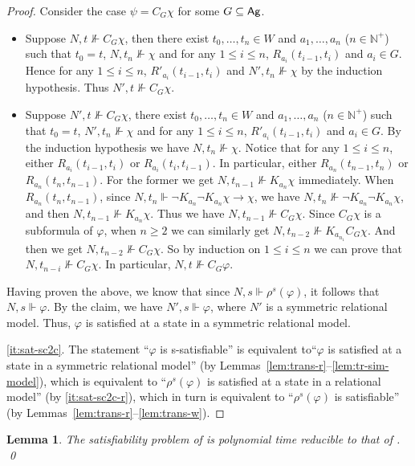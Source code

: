 \documentclass{article}
\newtheorem{lemma}[theorem]{Lemma}%
\newcommand{\ag}{\text{\normalfont\textsf{Ag}}\xspace}
\renewcommand{\phi}{\varphi}
\newcommand{\ra}{\rightarrow}
\newcommand{\mbN}{\mathbb{N}}
\newcommand{\lc}{\text{\normalfont ELC}\xspace}
\newcommand{\lsc}{\text{\normalfont ELC$^s$}\xspace}
\begin{document}
\begin{proof}
Consider the case $\psi=C_G\chi$ for some $G\subseteq\ag$.
\begin{itemize}
\item Suppose $N,t\not\Vdash C_G\chi$, then there exist $t_0,\dots,t_n\in W$ and $a_1,\dots,a_n$ ($n\in\mbN^+$) such that $t_0=t$, $N,t_n\not\Vdash\chi$ and for any $1\leq i\leq n$, $R_{a_i}(t_{i-1},t_i)$ and $a_i\in G$. Hence for any $1\leq i\leq n$, $R'_{a_i}(t_{i-1},t_i)$ and $N',t_n\not\Vdash\chi$ by the induction hypothesis. Thus $N',t\not\Vdash C_G\chi$.
\item Suppose $N',t\not\Vdash C_G\chi$, there exist $t_0,\dots,t_n\in W$ and $a_1,\dots,a_n$ ($n\in\mbN^+$) such that $t_0=t$, $N',t_n\not\Vdash\chi$ and for any $1\leq i\leq n$, $R'_{a_i}(t_{i-1},t_i)$ and $a_i\in G$. By the induction hypothesis we have $N,t_n\not\Vdash\chi$. Notice that for any $1\leq i\leq n$, either $R_{a_i}(t_{i-1},t_i)$ or $R_{a_i}(t_i,t_{i-1})$. In particular, either $R_{a_n}(t_{n-1},t_n)$ or $R_{a_n}(t_n,t_{n-1})$. For the former we get $N,t_{n-1}\not\Vdash K_{a_n}\chi$ immediately. When $R_{a_n}(t_n,t_{n-1})$, since $N,t_n\Vdash\neg K_{a_n}\neg K_{a_n}\chi\ra\chi$, we have $N,t_n\not\Vdash\neg K_{a_n}\neg K_{a_n}\chi$, and then $N,t_{n-1}\not\Vdash K_{a_n}\chi$. Thus we have $N,t_{n-1}\not\Vdash C_G\chi$. Since $C_G\chi$ is a subformula of $\phi$, when $n\geq 2$ we can similarly get $N,t_{n-2}\not\Vdash K_{a_{n_1}}C_G\chi$. And then we get $N,t_{n-2}\not\Vdash C_G\chi$. So by induction on $1\leq i\leq n$ we can prove that $N,t_{n-i}\not\Vdash C_G\chi$. In particular, $N,t\not\Vdash C_G\phi$.
\end{itemize}
Having proven the above, we know that since $N,s\Vdash\rho^s(\phi)$, it follows that $N,s\Vdash\phi$. By the claim, we have $N',s\Vdash\phi$, where $N'$ is a symmetric relational model. Thus, $\phi$ is satisfied at a state in a symmetric relational model.

\ref{it:sat-sc2c}. The statement ``$\phi$ is s-satisfiable'' is equivalent to``$\phi$ is satisfied at a state in a symmetric relational model'' (by Lemmas~\ref{lem:trans-r}--\ref{lem:tr-sim-model}), which is equivalent to ``$\rho^s(\phi)$ is satisfied at a state in a relational model'' (by \ref{it:sat-sc2c-r}), which in turn is equivalent to ``$\rho^s(\phi)$ is satisfiable'' (by Lemmas~\ref{lem:trans-r}--\ref{lem:trans-w}).
\end{proof}

\begin{lemma}\label{lem:red-sc2c}
The satisfiability problem of \lsc is polynomial time reducible to that of \lc.
\qed
\end{lemma}
\end{document}
